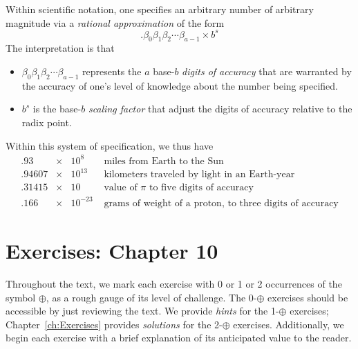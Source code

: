 \medskip

Within scientific notation, one specifies an arbitrary number of arbitrary magnitude via a {\em rational approximation} of the form
\[ . \beta_0 \beta_1 \beta_2 \cdots \beta_{a-1} \times b^s \]
The interpretation is that
\begin{itemize}
\item
$\beta_0 \beta_1 \beta_2 \cdots \beta_{a-1}$ represents the $a$ base-$b$ {\em digits of accuracy} that are warranted by the accuracy of one's level of knowledge about the number being specified.

\medskip\item
$b^s$ is the base-$b$ {\em scaling factor} that adjust the digits of accuracy relative to the radix point.
\end{itemize}
Within this system of specification, we thus have
\[ \begin{array}{lcll}
.93       & \times & 10^8      & \mbox{ miles from Earth to the Sun} \\
.94607 & \times & 10^{13}  & \mbox{ kilometers traveled by light in an Earth-year} \\
.31415 & \times & 10          & \mbox{ value of $\pi$ to five digits of accuracy} \\
.166     & \times & 10^{-23} & \mbox{ grams of weight of a proton, to three digits of accuracy}
\end{array}
\]



\section{Exercises: Chapter 10}

Throughout the text, we mark each exercise with 0 or 1 or 2 occurrences of the symbol $\oplus$, as a rough gauge of its level of challenge.  The 0-$\oplus$ exercises should be accessible by just reviewing the text.  We provide {\em hints} for the 1-$\oplus$ exercises; Chapter~\ref{ch:Exercises} provides {\em solutions} for the 2-$\oplus$ exercises.  Additionally, we begin each exercise with a brief explanation of its anticipated value to the reader. 

